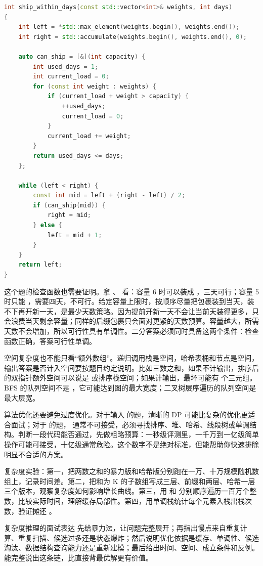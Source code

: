 \begin{lstlisting}[language=C++,caption={LeetCode 1011 在 D 天内送达包裹：容量越大越容易可行}]
int ship_within_days(const std::vector<int>& weights, int days)
{
    int left = *std::max_element(weights.begin(), weights.end());
    int right = std::accumulate(weights.begin(), weights.end(), 0);

    auto can_ship = [&](int capacity) {
        int used_days = 1;
        int current_load = 0;
        for (const int weight : weights) {
            if (current_load + weight > capacity) {
                ++used_days;
                current_load = 0;
            }
            current_load += weight;
        }
        return used_days <= days;
    };

    while (left < right) {
        const int mid = left + (right - left) / 2;
        if (can_ship(mid)) {
            right = mid;
        } else {
            left = mid + 1;
        }
    }
    return left;
}
\end{lstlisting}

这个题的检查函数也需要证明。拿 、 看：容量 6 时可以装成 \code{[1,2,3] | [4] | [5]}，三天可行；容量 5 时只能 \code{[1,2] | [3] | [4] | [5]}，需要四天，不可行。给定容量上限时，按顺序尽量把包裹装到当天，装不下再开新一天，是最少天数策略。因为提前开新一天不会让当前天装得更多，只会浪费当天剩余容量；同样的后缀包裹只会面对更紧的天数预算。容量越大，所需天数不会增加，所以可行性具有单调性。二分答案必须同时具备这两个条件：检查函数正确，答案可行性单调。

空间复杂度也不能只看“额外数组”。递归调用栈是空间，哈希表桶和节点是空间，输出答案是否计入空间要按题目约定说明。比如三数之和，如果不计输出，排序后的双指针额外空间可以说是  或排序栈空间；如果计输出，最坏可能有  个三元组。BFS 的队列空间不是 ，它可能达到图的最大宽度；二叉树层序遍历的队列空间是最大层宽。

算法优化还要避免过度优化。对于输入  的题，清晰的  DP 可能比复杂的优化更适合面试；对于  的题， 通常不可接受，必须寻找排序、堆、哈希、线段树或单调结构。判断一段代码能否通过，先做粗略预算：一秒级评测里，一千万到一亿级简单操作可能可接受，十亿级通常危险。这个数字不是绝对标准，但能帮助你快速排除明显不合适的方案。

\begin{labbox}
复杂度实验：第一，把两数之和的暴力版和哈希版分别跑在一万、十万规模随机数组上，记录时间差。第二，把和为 K 的子数组写成三层、前缀和两层、哈希一层三个版本，观察复杂度如何影响增长曲线。第三，用  和  分别顺序遍历一百万个整数，比较实际时间，理解缓存局部性。第四，用单调栈统计每个元素入栈出栈次数，验证摊还 。
\end{labbox}

\begin{principlebox}{复杂度推理的面试表达}
先给暴力法，让问题完整展开；再指出慢点来自重复计算、重复扫描、候选过多还是状态爆炸；然后说明优化依据是缓存、单调性、候选淘汰、数据结构查询能力还是重新建模；最后给出时间、空间、成立条件和反例。能完整说出这条链，比直接背最优解更有价值。
\end{principlebox}


